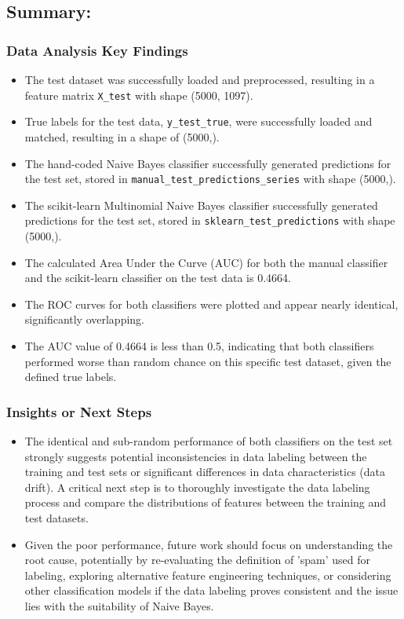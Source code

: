 \documentclass[12pt,a4paper]{article}
\begin{document}
\subsection{Summary:}

\subsubsection{Data Analysis Key Findings}

\begin{itemize}
    \item The test dataset was successfully loaded and preprocessed, resulting in a feature matrix \texttt{X\_test} with shape (5000, 1097).
    \item True labels for the test data, \texttt{y\_test\_true}, were successfully loaded and matched, resulting in a shape of (5000,).
    \item The hand-coded Naive Bayes classifier successfully generated predictions for the test set, stored in \texttt{manual\_test\_predictions\_series} with shape (5000,).
    \item The scikit-learn Multinomial Naive Bayes classifier successfully generated predictions for the test set, stored in \texttt{sklearn\_test\_predictions} with shape (5000,).
    \item The calculated Area Under the Curve (AUC) for both the manual classifier and the scikit-learn classifier on the test data is 0.4664.
    \item The ROC curves for both classifiers were plotted and appear nearly identical, significantly overlapping.
    \item The AUC value of 0.4664 is less than 0.5, indicating that both classifiers performed worse than random chance on this specific test dataset, given the defined true labels.
\end{itemize}

\subsubsection{Insights or Next Steps}

\begin{itemize}
    \item The identical and sub-random performance of both classifiers on the test set strongly suggests potential inconsistencies in data labeling between the training and test sets or significant differences in data characteristics (data drift). A critical next step is to thoroughly investigate the data labeling process and compare the distributions of features between the training and test datasets.
    \item Given the poor performance, future work should focus on understanding the root cause, potentially by re-evaluating the definition of 'spam' used for labeling, exploring alternative feature engineering techniques, or considering other classification models if the data labeling proves consistent and the issue lies with the suitability of Naive Bayes.
\end{itemize}
\end{document}

